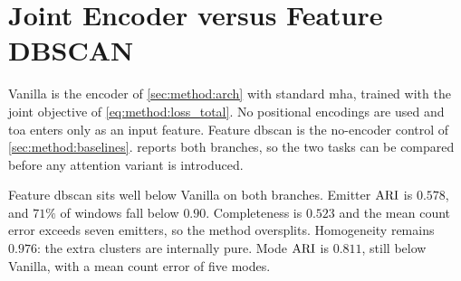 \section{Joint Encoder versus Feature DBSCAN}\label{sec:exp:results}\label{sec:exp:results:vanilla}

Vanilla is the encoder of \cref{sec:method:arch} with standard \gls{mha}, trained with the joint objective of \cref{eq:method:loss_total}.
No positional encodings are used and \Gls{toa} enters only as an input feature.
Feature \gls{dbscan} is the no-encoder control of \cref{sec:method:baselines}.
 reports both branches, so the two tasks can be compared before any attention variant is introduced.

\begin{table}[tbp]
  \centering
  \small
  \caption{Feature \gls{dbscan} (Baseline) versus jointly trained Vanilla encoder. Entries are mean $\pm$ std. Hom.\ and Comp.\ are homogeneity and completeness.}
  \label{tab:exp:vanilla}
\end{table}

Feature \gls{dbscan} sits well below Vanilla on both branches.
Emitter $\mathrm{ARI}$ is $0.578$, and $71\%$ of windows fall below $0.90$.
Completeness is $0.523$ and the mean count error exceeds seven emitters, so the method oversplits.
Homogeneity remains $0.976$: the extra clusters are internally pure.
Mode $\mathrm{ARI}$ is $0.811$, still below Vanilla, with a mean count error of five modes.

